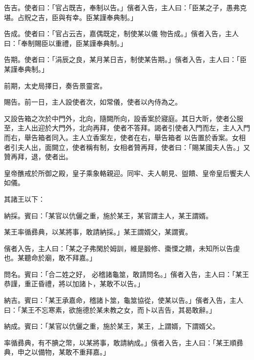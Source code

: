 \begin{pinyinscope}
 告吉。使者曰：「官占既吉，奉制以告。」儐者入告，主人曰：「臣某之子，愚弗克堪。占貺之吉，臣與有幸。臣某謹奉典制。」



 告成。使者曰：「官占云吉，嘉偶既定，制使某以儀
 物告成。」儐者入告，主人曰：「奉制賜臣以重禮，臣某謹奉典制。」



 告期。使者曰：「涓辰之良，某月某日吉，制使某告期。」儐者入告，主人曰：「臣某謹奉典制。」



 前期，太史局擇日，奏告景靈宮。



 賜告。前一日，主人設使者次，如常儀，使者以內侍為之。



 又設告箱之次於中門外，北向，隨闕所向，設香案於寢庭。其日大昕，使者公服至，主人出迎於大門外，北向再拜，使者不答拜。謁者引使者入門而左，主人入門而右，舉告箱者同入。主人立香案左，使者在右，舉告箱者
 以告置於香案。女相者引夫人出，面闕立，使者稱有制，女相者贊再拜，使者曰：「賜某國夫人告。」又贊再拜，退，使者出。



 皇帝醮戒於所御之殿，皇子乘象輅親迎。同牢、夫人朝見、盥饋、皇帝皇后饗夫人如儀。



 其諸王以下：



 納採。賓曰：「某官以伉儷之重，施於某王，某官謂主人，某王謂婿。



 某王率循彞典，以某將事，敢請納採。」某王謂婿父，某謂賓。



 儐者入告，主人曰：「某之子弗閑於姆訓，維是腶修、棗慄之饋，未知所以告虔也。某聽命於廟，敢不拜嘉。」



 問名。賓曰：「合二姓之好，
 必稽諸龜筮，敢請問名。」儐者入告，主人曰：「某王恭謹，重正昏禮，將以加諸卜，某敢不以告。」



 納吉。賓曰：「某王承嘉命，稽諸卜筮，龜筮協從，使某以告。」儐者入告，主人曰：「某王不忘寒素，欲施德於某未教之女，而卜以吉告，其曷敢辭。」



 納成。賓曰：「某官以伉儷之重，施於某王，某王，上謂婿，下謂婿父。



 率循彞典，有不腆之幣，以某將事，敢請納成。」儐者入告，主人曰：「某王順彞典，申之以備物，某敢不重拜嘉。」




\end{pinyinscope}
